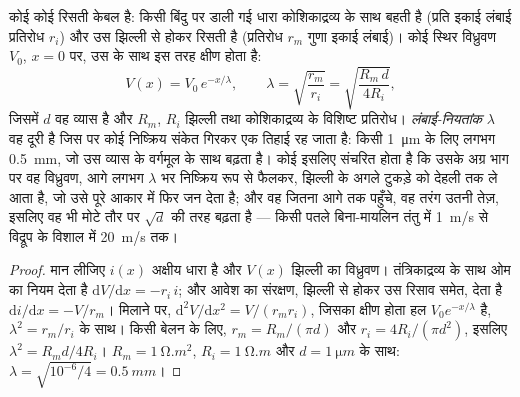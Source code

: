 \begin{theorem}[वह केबल और उसका लंबाई-नियतांक]\label{thm:b2:neurons-synapses:cable}
कोई  कोई रिसती केबल है: किसी बिंदु पर डाली गई धारा
कोशिकाद्रव्य के साथ बहती है (प्रति इकाई लंबाई प्रतिरोध $r_i$) और उस
झिल्ली से होकर रिसती है (प्रतिरोध $r_m$ गुणा इकाई लंबाई)। कोई स्थिर
विध्रुवण $V_0$, $x = 0$ पर, उस  के साथ इस तरह क्षीण होता है:
\[
V(x) = V_0\,e^{-x/\lambda}, \qquad \lambda = \sqrt{\frac{r_m}{r_i}} = \sqrt{\frac{R_m\,d}{4R_i}},
\]
जिसमें $d$ वह व्यास है और $R_m$, $R_i$ झिल्ली तथा
कोशिकाद्रव्य के विशिष्ट प्रतिरोध। \emph{लंबाई-नियतांक}
$\lambda$ वह दूरी है जिस पर कोई निष्क्रिय संकेत गिरकर
एक तिहाई रह जाता है: किसी \qty{1}{\micro m}  के लिए लगभग \qty{0.5}{mm}, जो
उस व्यास के वर्गमूल के साथ बढ़ता है। कोई  इसलिए
संचरित होता है कि उसके अग्र भाग पर वह विध्रुवण, आगे लगभग $\lambda$ भर
निष्क्रिय रूप से फैलकर, झिल्ली के अगले टुकड़े को
देहली तक ले आता है, जो उसे पूरे आकार में फिर जन देता है; और वह जितना आगे तक
पहुँचे, वह तरंग उतनी तेज़, इसलिए वह  भी
मोटे तौर पर $\sqrt{d}$ की तरह बढ़ता है --- किसी पतले
बिना-मायलिन तंतु में \qty{1}{m/s} से विद्रूप के विशाल  में \qty{20}{m/s} तक।
\end{theorem}
\begin{proof}
मान लीजिए $i(x)$ अक्षीय धारा है और $V(x)$ झिल्ली का
विध्रुवण। तंत्रिकाद्रव्य के साथ ओम का नियम देता है $\mathrm{d}V/
\mathrm{d}x = -r_i\,i$; और आवेश का संरक्षण, झिल्ली से होकर उस रिसाव समेत,
देता है $\mathrm{d}i/\mathrm{d}x = -V/r_m$। मिलाने पर,
$\mathrm{d}^{2}V/\mathrm{d}x^{2} = V/(r_m r_i)$, जिसका क्षीण होता
हल $V_0 e^{-x/\lambda}$ है, $\lambda^{2} = r_m/r_i$ के साथ। किसी
बेलन के लिए, $r_m = R_m/(\pi d)$ और $r_i = 4R_i/(\pi d^{2})$, इसलिए
$\lambda^{2} = R_m d/4R_i$। $R_m = \qty{1}{\ohm.m^2}$, $R_i =
\qty{1}{\ohm.m}$ और $d = \qty{1}{\micro m}$ के साथ: $\lambda = \sqrt{10^{-6}
/4} = \qty{0.5}{mm}$।
\end{proof}

